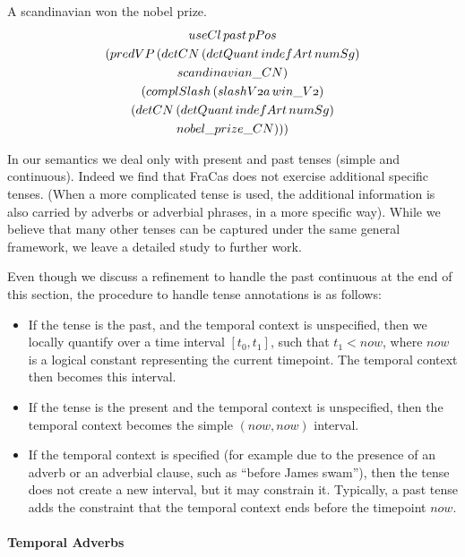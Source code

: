 \documentclass[11pt,a4paper]{article}
\newcommand\onelingex[1]{\begin{lingex}\item #1 \end{lingex}}
\begin{document}
\onelingex{A scandinavian won the nobel prize.\label{ex:nobel}
  \vspace{-1.5ex}
{\small\begin{multline*}
\mathnormal{useCl}\, \mathnormal{past}\, \mathnormal{pPos}\\ (\mathnormal{predVP}\, (\mathnormal{detCN}\, (\mathnormal{detQuant}\, \mathnormal{indefArt}\, \mathnormal{numSg})\\ \mathnormal{scandinavian\_CN})\\ (\mathnormal{complSlash}\, (\mathnormal{slashV2a}\, \mathnormal{win\_V2})\\ (\mathnormal{detCN}\, (\mathnormal{detQuant}\, \mathnormal{indefArt}\, \mathnormal{numSg})\\ \mathnormal{nobel\_prize\_CN})))
\end{multline*}
}}
%
In our semantics we deal only with present and past tenses (simple and
continuous). Indeed we find that FraCas does not exercise additional
specific tenses. (When a more complicated tense is used, the
additional information is also carried by adverbs or adverbial
phrases, in a more specific way). While we believe that many other
tenses can be captured under the same general framework, we leave a
detailed study to further work.

Even though we discuss a refinement to handle the past continuous
at the end of this section, the procedure to handle tense annotations
is as follows:
\begin{itemize}
\item If the tense is the past, and the temporal context is
  unspecified, then we locally quantify over a time interval
  $[t_0,t_1]$, such that $t_1 < now$, where $now$ is a logical
  constant representing the current timepoint. The temporal context
  then becomes this interval.
\item If the tense is the present and the temporal context is
  unspecified, then the temporal context becomes the simple
  $(now,now)$ interval.
\item If the temporal context is specified (for example due to the presence of an adverb or an
  adverbial clause, such as ``before James swam''), then the tense does
  not create a new interval, but it may constrain it. Typically, a
  past tense adds the constraint that the temporal context ends before
  the timepoint $now$.
\end{itemize}

\paragraph{Temporal Adverbs}
\end{document}
